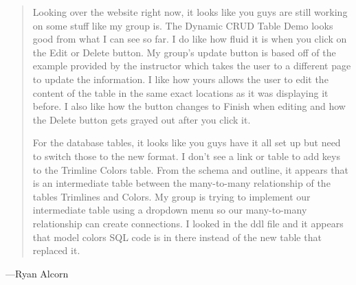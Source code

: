 \documentclass[11pt,letterpaper,oneside]{amsart}
\begin{document}
\begin{tcolorbox} \begin{quotation}

Looking over the website right now, it looks like you guys are still working on some stuff like my group is. The Dynamic CRUD Table Demo looks good from what I can see so far. I do like how fluid it is when you click on the Edit or Delete button. My group's update button is based off of the example provided by the instructor which takes the user to a different page to update the information. I like how yours allows the user to edit the content of the table in the same exact locations as it was displaying it before. I also like how the button changes to Finish when editing and how the Delete button gets grayed out after you click it.

For the database tables, it looks like you guys have it all set up but need to switch those to the new format. I don't see a link or table to add keys to the Trimline Colors table. From the schema and outline, it appears that is an intermediate table between the many-to-many relationship of the tables Trimlines and Colors. My group is trying to implement our intermediate table using a dropdown menu so our many-to-many relationship can create connections. I looked in the ddl file and it appears that model colors SQL code is in there instead of the new table that replaced it.

\end{quotation} \end{tcolorbox}

---Ryan Alcorn
\end{document}
